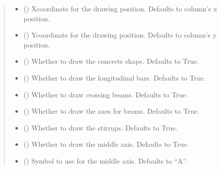 \documentclass[a4paper,10pt,english]{sphinxmanual}
\begin{document}
\begin{fulllineitems}
\begin{fulllineitems}
\begin{quote}
\begin{description}
\begin{itemize}
\item {} 
\sphinxAtStartPar
{} (\sphinxstyleliteralemphasis{\sphinxupquote{, }}) \textendash{} X\sphinxhyphen{}coordinate for the drawing position. Defaults to column’s x position.

\item {} 
\sphinxAtStartPar
{} (\sphinxstyleliteralemphasis{\sphinxupquote{, }}) \textendash{} Y\sphinxhyphen{}coordinate for the drawing position. Defaults to column’s y position.

\item {} 
\sphinxAtStartPar
{} () \textendash{} Whether to draw the concrete shape. Defaults to True.

\item {} 
\sphinxAtStartPar
{} () \textendash{} Whether to draw the longitudinal bars. Defaults to True.

\item {} 
\sphinxAtStartPar
{} () \textendash{} Whether to draw crossing beams. Defaults to True.

\item {} 
\sphinxAtStartPar
{} () \textendash{} Whether to draw the axes for beams. Defaults to True.

\item {} 
\sphinxAtStartPar
{} () \textendash{} Whether to draw the stirrups. Defaults to True.

\item {} 
\sphinxAtStartPar
{} () \textendash{} Whether to draw the middle axis. Defaults to True.

\item {} 
\sphinxAtStartPar
{} () \textendash{} Symbol to use for the middle axis. Defaults to “A”.


\end{itemize}
\end{description}
\end{quote}
\end{fulllineitems}
\end{fulllineitems}
\end{document}
